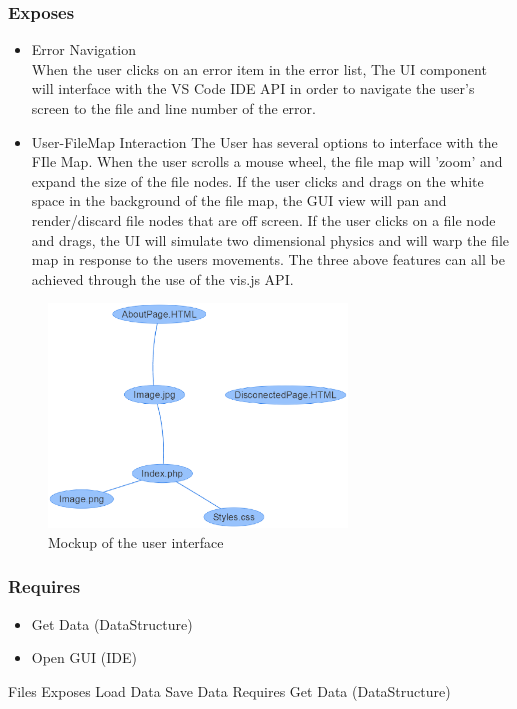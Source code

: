 \documentclass[letterpaper,10pt,titlepage,draftclsnofoot,onecolumn,onesided] {IEEEtran}
\begin{document}
		\subsubsection{Exposes}
		\begin{itemize}
			\item Error Navigation 
			\\
			When the user clicks on an error item in the error list, The UI component will interface with the VS Code IDE API in order to navigate the user's screen to the file and line number of the error.
			\item User-FileMap Interaction
			The User has several options to interface with the FIle Map. 
			When the user scrolls a mouse wheel, the file map will 'zoom' and expand the size of the file nodes.
			If the user clicks and drags on the white space in the background of the file map, the GUI view will pan and render/discard file nodes that are off screen.
			If the user clicks on a file node and drags, the UI will simulate two dimensional physics and will warp the file map in response to the users movements.
			The three above features can all be achieved through the use of the vis.js API.
		\end{itemize}
		\begin{figure}
                 \includegraphics[width=300px]{UIMockupEPS.eps}
                 \caption{Mockup of the user interface}
                 \end{figure}
		\subsubsection{Requires}
		\begin{itemize}
			\item Get Data (DataStructure)
			\item Open GUI (IDE)
		\end{itemize}
		
	Files
		Exposes
			Load Data
			Save Data
		Requires
			Get Data (DataStructure)





\pagebreak


\end{document}
